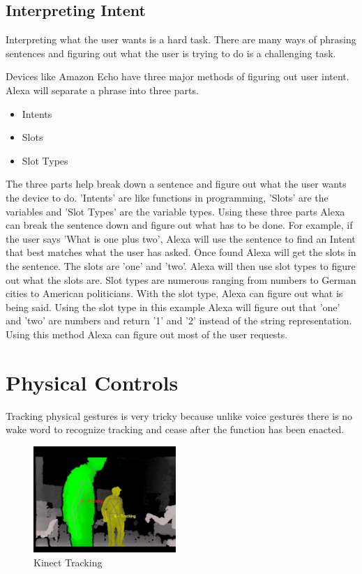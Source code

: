 \subsection{Interpreting Intent}
Interpreting what the user wants is a hard task. There are many ways of phrasing sentences and figuring out what the user is trying to do is a challenging task.

Devices like Amazon Echo have three major methods of figuring out user intent. Alexa will separate a phrase into three parts.

\begin{itemize}
    \item Intents
    \item Slots
    \item Slot Types
\end{itemize}

The three parts help break down a sentence and figure out what the user wants the device to do. 'Intents' are like functions in programming, 'Slots' are the variables and 'Slot Types' are the variable types. Using these three parts Alexa can break the sentence down and figure out what has to be done. For example, if the user says 'What is one plus two',
Alexa will use the sentence to find an Intent that best matches what the user has asked. Once found Alexa will get the slots in the sentence. The slots are 'one' and 'two'. Alexa will then use slot types to figure out what the slots are. Slot types are numerous ranging from numbers to German cities to American politicians. With the slot type, Alexa can figure out what is being said. Using the slot type in this example Alexa will figure out that 'one' and 'two' are numbers and return '1' and '2' instead of the string representation. Using this method Alexa can figure out most of the user requests.

\section{Physical Controls}

Tracking physical gestures is very tricky because unlike voice gestures there is no wake word to recognize tracking and cease after the function has been enacted. 

\begin{figure}
  \begin{center}
    \includegraphics[width=0.48\textwidth]{img/kinecttracking.jpg}
  \end{center}
  \caption{Kinect Tracking}
\end{figure}

